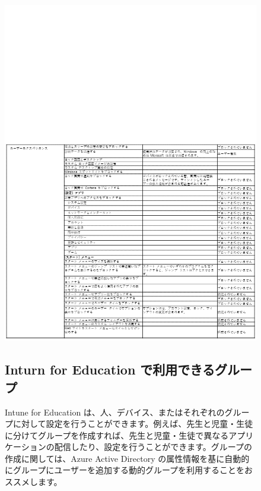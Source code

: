 \begin{figure}[htbp]
    \centering
    \vspace{-11cm}
    \includegraphics[width=17cm]{figures/IntuneforEducation-05.png}
    \vspace{10cm}
\end{figure}

\begin{figure}[htbp]
    \subsection{Inturn for Education で利用できるグループ}
    
    \hspace{8pt} Intune for Education は、人、デバイス、またはそれぞれのグループに対して設定を行うことができます。例えば、先生と児童・生徒に分けてグループを作成すれば、先生と児童・生徒で異なるアプリケーションの配信したり、設定を行うことができます。グループの作成に関しては、Azure Active Directory の属性情報を基に自動的にグループにユーザーを追加する動的グループを利用することをおススメします。
\end{figure}

